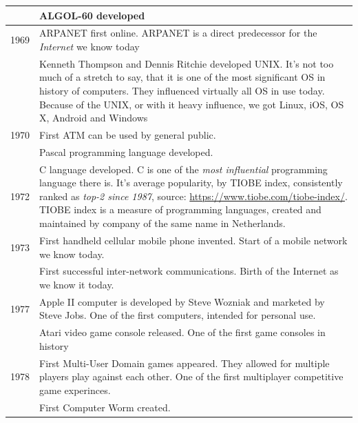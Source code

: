 \documentclass{article}
\begin{document}
\begin{longtable}{p{}p{}}
                \cmidrule(r){2-2}
                        & ALGOL-60 developed \\
                \midrule
                1969 & ARPANET first online. ARPANET is a direct predecessor for the \emph{Internet} we know today\\
                \cmidrule(r){2-2}
                        & Kenneth Thompson and Dennis Ritchie developed UNIX. It's not too much of a stretch to say, that it is one of the most significant OS in history
                        of computers. They influenced virtually all OS in use today. Because of the UNIX, or with it heavy influence, we got Linux, iOS, OS X, Android and Windows\\
                \midrule
                1970 & First ATM can be used by general public. \\
                \cmidrule(r){2-2}
                        & Pascal programming language developed. \\
                \midrule
                1972 & C language developed. C is one of the \emph{most influential} programming language there is. It's average popularity, by 
                TIOBE index, consistently ranked as \emph{top-2 since 1987}, source: \href{https://www.tiobe.com/tiobe-index/}{https://www.tiobe.com/tiobe-index/}.
                TIOBE index is a measure of programming languages, created and maintained by company of the same name in Netherlands. \\
                \midrule
                1973 & First handheld cellular mobile phone invented. Start of a mobile network we know today. \\
                \cmidrule(r){2-2}
                     & First successful inter-network communications. Birth of the Internet as we know it today. \\ 
                \midrule
                1977 & Apple II computer is developed by Steve Wozniak and marketed by Steve Jobs. One of the first computers, intended for personal use. \\
                \cmidrule(r){2-2}
                     & Atari video game console released. One of the first game consoles in history\\
                \midrule
                1978 & First Multi-User Domain games appeared. They allowed for multiple players play against each other. One of the first multiplayer competitive game experinces.\\
                \cmidrule(r){2-2}
                     & First Computer Worm created.\\

\end{longtable}
\end{document}
